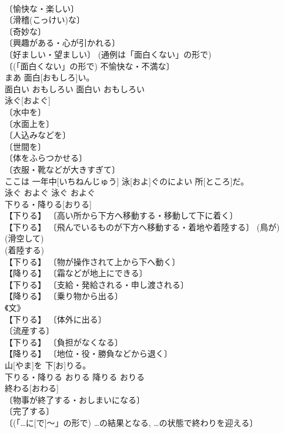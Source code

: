 \documentclass[8pt]{extreport}
\begin{document}
\begin{CJK}{UTF8}{min}
\\	〔愉快な・楽しい〕 
\\	〔滑稽(こっけい)な〕 
\\	〔奇妙な〕 
\\	〔興趣がある・心が引かれる〕 
\\	〔好ましい・望ましい〕 (通例は「面白くない」の形で) 
\\	〔(「面白くない」の形で) 不愉快な・不満な〕 
\\	まあ 面白[おもしろ]い。	
\\	面白い	おもしろい	面白い	おもしろい	
\\	泳ぐ[およぐ]	
\\	〔水中を〕 
\\	〔水面上を〕 
\\	〔人込みなどを〕 
\\	〔世間を〕 
\\	〔体をふらつかせる〕 
\\	〔衣服・靴などが大きすぎて〕 
\\	ここは 一年中[いちねんじゅう] 泳[およ]ぐのによい 所[ところ]だ。	
\\	泳ぐ	およぐ	泳ぐ	およぐ	
\\	下りる・降りる[おりる]	
\\	【下りる】 〔高い所から下方へ移動する・移動して下に着く〕 
\\	【下りる】 〔飛んでいるものが下方へ移動する・着地や着陸する〕 (鳥が) 
\\	(滑空して) 
\\	(着陸する) 
\\	【下りる】 〔物が操作されて上から下へ動く〕 
\\	【降りる】 〔霜などが地上にできる〕 
\\	【下りる】 〔支給・発給される・申し渡される〕 
\\	【降りる】 〔乗り物から出る〕 
\\	《文》 
\\	【下りる】 〔体外に出る〕 
\\	〔流産する〕 
\\	【下りる】 〔負担がなくなる〕 
\\	【降りる】 〔地位・役・勝負などから退く〕 
\\	山[やま]を 下[お]りる。	
\\	下りる・降りる	おりる	降りる	おりる	
\\	終わる[おわる]	
\\	〔物事が終了する・おしまいになる〕 
\\	〔完了する〕 
\\	〔(「…に[で]～」の形で) …の結果となる, …の状態で終わりを迎える〕 

\end{CJK}
\end{document}
